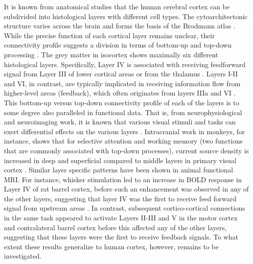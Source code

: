 \documentclass[9pt,lineno]{aperture}
\begin{document}
It is known from anatomical studies that the human cerebral cortex can be subdivided into histological layers with different cell types. The cytoarchitectonic structure varies across the brain and forms the basis of the Brodmann atlas \citep{Brodmann1909}. While the precise function of each cortical layer remains unclear, their connectivity profile suggests a division in terms of bottom-up and top-down processing \citep{Felleman1991,Barone2000,Shipp2016}. The grey matter in isocortex shows maximally six different histological layers. Specifically, Layer IV is associated with receiving feedforward signal from Layer III of lower cortical areas or from the thalamus \citep{Jones1998,Constantinople2013}. Layers I-II and VI, in contrast, are typically implicated in receiving information flow from higher-level areas (feedback), which often originates from layers IIIa and VI  \citep{Markov2013}. This bottom-up versus top-down connectivity profile of each of the layers is to some degree also paralleled in functional data. That is, from neurophysiological and neuroimaging work, it is known that various visual stimuli and tasks can exert differential effects on the various layers \citep{Maier2010,Xing2012,Self2013,VelezFort2014, OHerron2016}. Intracranial work in monkeys, for instance, shows that for selective attention and working memory (two functions that are commonly associated with top-down processes), current source density is increased in deep and superficial compared to middle layers in primary visual cortex \citep{VanKerkoerle2017}. Similar layer specific patterns have been shown in animal functional MRI. For instance, whisker stimulation led to an increase in BOLD response in Layer IV of rat barrel cortex, before such an enhancement was observed in any of the other layers, suggesting that layer IV was the first to receive feed forward signal from upstream areas \citep{Yu2014}. In contrast, subsequent cortico-cortical connections in the same task appeared to activate Layers II-III and V in the motor cortex and contralateral barrel cortex before this affected any of the other layers, suggesting that these layers were the first to receive feedback signals. To what extent these results generalize to human cortex, however, remains to be investigated.
\end{document}
